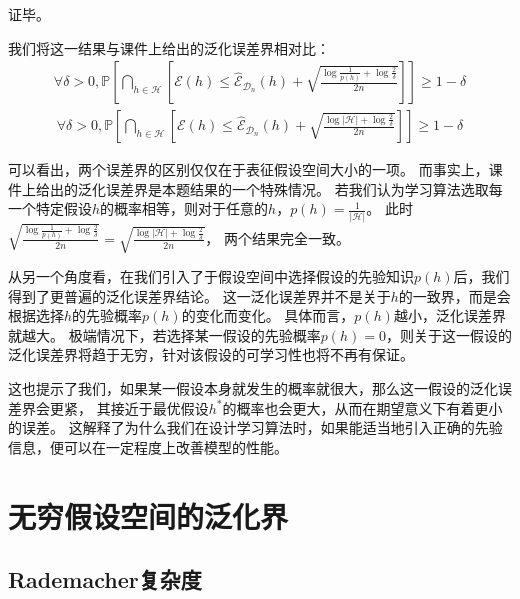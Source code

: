 \documentclass[12pt, a4paper]{article}
\newcommand{\prob}{{\mathbb{P}}}
\newcommand{\EE}{{\mathcal{E}}}
\newcommand{\HH}{{\mathcal{H}}}
\newcommand{\DD}{{\mathcal{D}}}
\begin{document}
        证毕。

        我们将这一结果与课件上给出的泛化误差界相对比：
        \begin{align*}
        \forall \delta > 0, \prob[\bigcap_{h \in \HH} [\EE(h) \le \hat{\EE}_{\DD_n}(h) + \sqrt{\frac{\log \frac{1}{p(h)} + \log \frac{2}{\delta}}{2n}}]] \ge 1 - \delta
        \end{align*}
        \begin{align*}
        \forall \delta > 0, \prob[\bigcap_{h \in \HH} [\EE(h) \le \hat{\EE}_{\DD_n}(h) + \sqrt{\frac{\log \vert \HH \vert + \log \frac{2}{\delta}}{2n}}]] \ge 1 - \delta
        \end{align*}

        可以看出，两个误差界的区别仅仅在于表征假设空间大小的一项。
        而事实上，课件上给出的泛化误差界是本题结果的一个特殊情况。
        若我们认为学习算法选取每一个特定假设$h$的概率相等，则对于任意的$h$，$p(h) = \frac{1}{\vert \HH \vert}$。
        此时$\sqrt{\frac{\log \frac{1}{p(h)} + \log \frac{2}{\delta}}{2n}} = \sqrt{\frac{\log \vert \HH \vert + \log \frac{2}{\delta}}{2n}}$，
        两个结果完全一致。

        从另一个角度看，在我们引入了于假设空间中选择假设的先验知识$p(h)$后，我们得到了更普遍的泛化误差界结论。
        这一泛化误差界并不是关于$h$的一致界，而是会根据选择$h$的先验概率$p(h)$的变化而变化。
        具体而言，$p(h)$越小，泛化误差界就越大。
        极端情况下，若选择某一假设的先验概率$p(h) = 0$，则关于这一假设的泛化误差界将趋于无穷，针对该假设的可学习性也将不再有保证。

        这也提示了我们，如果某一假设本身就发生的概率就很大，那么这一假设的泛化误差界会更紧，
        其接近于最优假设$h^*$的概率也会更大，从而在期望意义下有着更小的误差。
        这解释了为什么我们在设计学习算法时，如果能适当地引入正确的先验信息，便可以在一定程度上改善模型的性能。

    \section{无穷假设空间的泛化界}

    \subsection{Rademacher复杂度}
\end{document}
